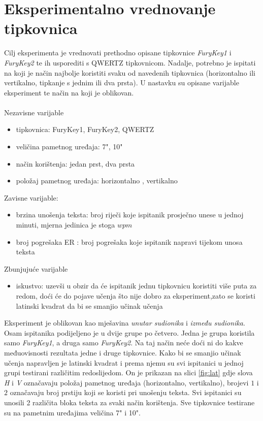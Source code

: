 \documentclass[times, utf8, zavrsni, numeric]{fer}
\begin{document}
\section{Eksperimentalno vrednovanje tipkovnica}
Cilj eksperimenta je vrednovati prethodno opisane tipkovnice \emph{FuryKey1} i \emph{FuryKey2} te ih usporediti s QWERTZ tipkovnicom. Nadalje, potrebno je ispitati na koji je način najbolje koristiti svaku od navedenih tipkovnica (horizontalno ili vertikalno, tipkanje s jednim ili dva prsta). U nastavku su opisane varijable eksperiment te način na koji je oblikovan.
\\\\Nezavisne varijable
\begin{itemize}
\item tipkovnica: FuryKey1, FuryKey2, QWERTZ
\item veličina pametnog uređaja: 7", 10"
\item način korištenja: jedan prst, dva prsta
\item položaj pametnog uređaja: horizontalno , vertikalno 
\end{itemize}
Zavisne varijable:
\begin{itemize}
\item brzina unošenja teksta: broj riječi koje ispitanik prosječno unese u jednoj minuti, mjerna jedinica je stoga $wpm$ 
\item broj pogrešaka ER : broj pogrešaka koje ispitanik napravi tijekom unosa teksta
\end{itemize}
Zbunjujuće varijable
\begin{itemize}
\item iskustvo: uzevši u obzir da će ispitanik jednu tipkovnicu koristiti više puta za redom, doći će do pojave učenja što nije dobro za eksperiment,zato se koristi latinski kvadrat da bi se smanjio učinak učenja\\
\end{itemize}
Eksperiment je oblikovan kao mješavina \emph{unutar sudionika} i \emph{između sudionika}. Osam ispitanika podijeljeno je u dvije grupe po četvero. Jedna je grupa koristila samo \emph{FuryKey1}, a druga samo \emph{FuryKey2}. Na taj način neće doći ni do kakve međuovisnosti rezultata jedne i druge tipkovnice. Kako bi se smanjio učinak učenja napravljen je latinski kvadrat i prema njemu su svi ispitanici u jednoj grupi testirani različitim redoslijedom. On je prikazan na slici \ref{fig:lat} gdje slova \emph{H} i \emph{V} označavaju položaj pametnog uređaja (horizontalno, vertikalno), brojevi $1$ i $2$ označavaju broj prstiju koji se koristi pri unošenju teksta. Svi ispitanici su unosili 2 različita bloka teksta za svaki način korištenja. Sve tipkovnice testirane su na pametnim uređajima veličina 7" i 10".
\end{document}
